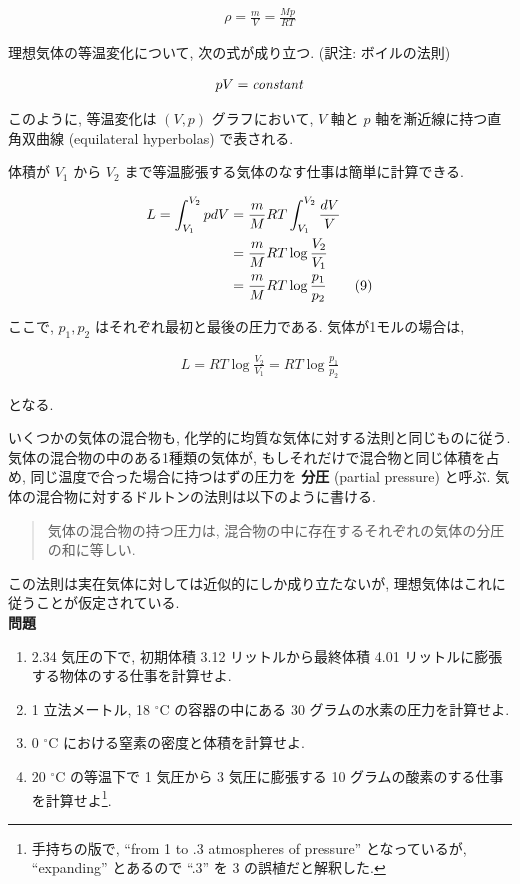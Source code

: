 \begin{align}\tag{8}
\rho=\frac{m}{V}=\frac{Mp}{RT}
\end{align}\par

理想気体の等温変化について, 次の式が成り立つ. (訳注: ボイルの法則)

\begin{align*}
pV={\it constant}
\end{align*}

このように, 等温変化は $(V,p)$ グラフにおいて, $V$ 軸と $p$ 軸を漸近線に持つ直角双曲線 (equilateral hyperbolas) で表される. \par
体積が $V_{1}$ から $V_{2}$ まで等温膨張する気体のなす仕事は簡単に計算できる. 

\begin{align}
L=\int_{V_{1}}^{V_{2}}pdV &= \frac{m}{M}RT\int_{V_{1}}^{V_{2}}\frac{dV}{V}\notag\\ 
&=\frac{m}{M}RT\log\frac{V_{2}}{V_{1}}\notag\\
&=\frac{m}{M}RT\log\frac{p_{1}}{p_{2}} \tag{9}
\end{align}

ここで, $p_{1}, p_{2}$ はそれぞれ最初と最後の圧力である. 気体が1モルの場合は, 

\begin{align}\tag{10}
L=RT\log\frac{V_{2}}{V_{1}}=RT\log\frac{p_{1}}{p_{2}}
\end{align}

となる. \par
いくつかの気体の混合物も, 化学的に均質な気体に対する法則と同じものに従う. 気体の混合物の中のある1種類の気体が, もしそれだけで混合物と同じ体積を占め, 同じ温度で合った場合に持つはずの圧力を \textbf{分圧} (partial pressure) と呼ぶ. 気体の混合物に対するドルトンの法則は以下のように書ける. 

\begin{quote}
気体の混合物の持つ圧力は, 混合物の中に存在するそれぞれの気体の分圧の和に等しい. 
\end{quote}

この法則は実在気体に対しては近似的にしか成り立たないが, 理想気体はこれに従うことが仮定されている.
\\

\textbf{\centering 問題}
\begin{enumerate}
\item 2.34 気圧の下で, 初期体積 3.12 リットルから最終体積 4.01 リットルに膨張する物体のする仕事を計算せよ.
\item 1 立法メートル, 18 $^\circ$C の容器の中にある 30 グラムの水素の圧力を計算せよ.
\item 0 $^\circ$C における窒素の密度と体積を計算せよ.
\item 20 $^\circ$C の等温下で 1 気圧から 3 気圧に膨張する 10 グラムの酸素のする仕事を計算せよ\footnote{手持ちの版で, ``from 1 to .3 atmospheres of pressure'' となっているが, ``expanding'' とあるので ``.3'' を 3 の誤植だと解釈した.}. 
\end{enumerate}
